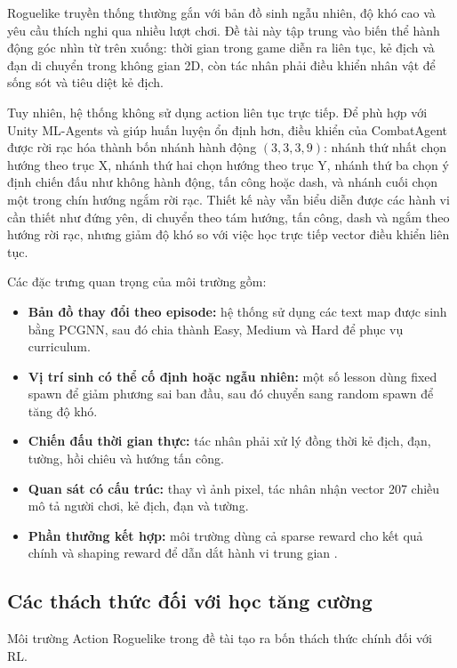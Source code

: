 Roguelike truyền thống thường gắn với bản đồ sinh ngẫu nhiên, độ khó cao và yêu cầu thích nghi qua nhiều lượt chơi. Đề tài này tập trung vào biến thể hành động góc nhìn từ trên xuống: thời gian trong game diễn ra liên tục, kẻ địch và đạn di chuyển trong không gian 2D, còn tác nhân phải điều khiển nhân vật để sống sót và tiêu diệt kẻ địch.

Tuy nhiên, hệ thống không sử dụng action liên tục trực tiếp. Để phù hợp với Unity ML-Agents và giúp huấn luyện ổn định hơn, điều khiển của CombatAgent được rời rạc hóa thành bốn nhánh hành động $(3,3,3,9)$: nhánh thứ nhất chọn hướng theo trục X, nhánh thứ hai chọn hướng theo trục Y, nhánh thứ ba chọn ý định chiến đấu như không hành động, tấn công hoặc dash, và nhánh cuối chọn một trong chín hướng ngắm rời rạc. Thiết kế này vẫn biểu diễn được các hành vi cần thiết như đứng yên, di chuyển theo tám hướng, tấn công, dash và ngắm theo hướng rời rạc, nhưng giảm độ khó so với việc học trực tiếp vector điều khiển liên tục.

Các đặc trưng quan trọng của môi trường gồm:

\begin{itemize}
    \item \textbf{Bản đồ thay đổi theo episode:} hệ thống sử dụng các text map được sinh bằng PCGNN, sau đó chia thành Easy, Medium và Hard để phục vụ curriculum.
    \item \textbf{Vị trí sinh có thể cố định hoặc ngẫu nhiên:} một số lesson dùng fixed spawn để giảm phương sai ban đầu, sau đó chuyển sang random spawn để tăng độ khó.
    \item \textbf{Chiến đấu thời gian thực:} tác nhân phải xử lý đồng thời kẻ địch, đạn, tường, hồi chiêu và hướng tấn công.
    \item \textbf{Quan sát có cấu trúc:} thay vì ảnh pixel, tác nhân nhận vector 207 chiều mô tả người chơi, kẻ địch, đạn và tường.
    \item \textbf{Phần thưởng kết hợp:} môi trường dùng cả sparse reward cho kết quả chính và shaping reward để dẫn dắt hành vi trung gian \cite{Ibrahim2024}.
\end{itemize}

\subsection{Các thách thức đối với học tăng cường}

Môi trường Action Roguelike trong đề tài tạo ra bốn thách thức chính đối với RL.


